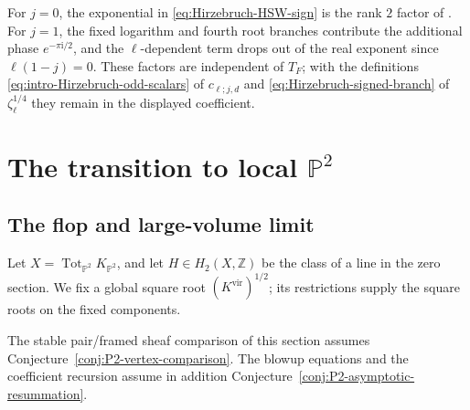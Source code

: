 \documentclass{amsart}
\theoremstyle{definition}
\numberwithin{equation}{section}
\newcommand{\Z}{\mathbb Z}
\newcommand{\Tot}{\operatorname{Tot}}
\begin{document}
For \(j=0\), the exponential in \eqref{eq:Hirzebruch-HSW-sign} is the rank \(2\) factor of \cite[equation~(3.128)]{HuangSunWang}.  For \(j=1\), the fixed logarithm and fourth root branches contribute the additional phase \(e^{-\pi\mathrm{i}/2}\), and the \(\ell\)-dependent term drops out of the real exponent since \(\ell(1-j)=0\).  These factors are independent of \(T_F\); with the definitions \eqref{eq:intro-Hirzebruch-odd-scalars} of \(c_{\ell;j,d}\) and \eqref{eq:Hirzebruch-signed-branch} of \(\zeta_\ell^{1/4}\) they remain in the displayed coefficient.

\section{The transition to local \texorpdfstring{\(\mathbb P^2\)}{P2}}
\label{sec:stable-pair-blowup}

\subsection{The flop and large-volume limit}
\label{sec:diagonal-P2}
Let \(X=\Tot_{\mathbb P^2}K_{\mathbb P^2}\), and let \(H\in H_2(X,\Z)\) be the class of a line in the zero section.  We fix a global square root \((K^{\mathrm{vir}})^{1/2}\); its restrictions supply the square roots on the fixed components.

The stable pair/framed sheaf comparison of this section assumes Conjecture~\ref{conj:P2-vertex-comparison}.  The blowup equations and the coefficient recursion assume in addition Conjecture~\ref{conj:P2-asymptotic-resummation}.
\end{document}
